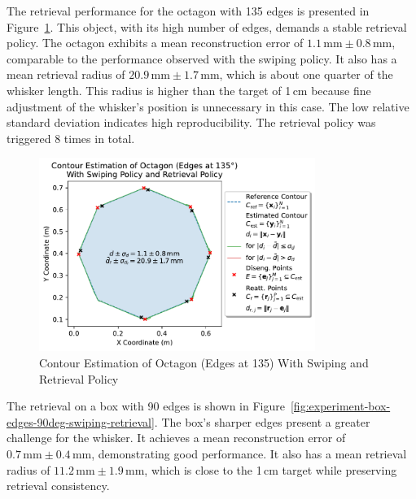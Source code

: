 The retrieval performance for the octagon with 135\degree{} edges is presented in Figure~\ref{fig:experiment-octagon-edges-135deg-swiping-retrieval}.
This object, with its high number of edges, demands a stable retrieval policy.
The octagon exhibits a mean reconstruction error of $1.1\,\text{mm} \pm 0.8\,\text{mm}$, comparable to the performance observed with the swiping policy.
It also has a mean retrieval radius of $20.9\,\text{mm} \pm 1.7\,\text{mm}$, which is about one quarter of the whisker length.
This radius is higher than the target of 1\,cm because fine adjustment of the whisker's position is unnecessary in this case.
The low relative standard deviation indicates high reproducibility.
The retrieval policy was triggered 8 times in total.

\begin{figure}[!htb]
    \centering
    \includegraphics[width=0.8\textwidth]{figures/experiments/octagon-edges-135deg-swiping-retrieval}
    \caption{Contour Estimation of Octagon (Edges at 135\degree{}) With Swiping and Retrieval Policy}
    \label{fig:experiment-octagon-edges-135deg-swiping-retrieval}
\end{figure}

The retrieval on a box with 90\degree{} edges is shown in Figure~\ref{fig:experiment-box-edges-90deg-swiping-retrieval}.
The box's sharper edges present a greater challenge for the whisker.
It achieves a mean reconstruction error of $0.7\,\text{mm} \pm 0.4\,\text{mm}$, demonstrating good performance.
It also has a mean retrieval radius of $11.2\,\text{mm} \pm 1.9\,\text{mm}$, which is close to the 1\,cm target while preserving retrieval consistency.

